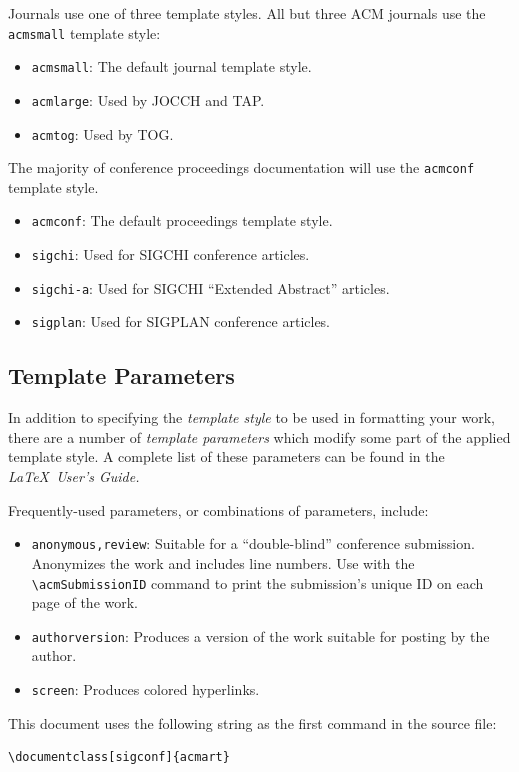 \documentclass[sigconf, nonacm]{acmart}
\begin{document}
Journals use one of three template styles. All but three ACM journals
use the {\verb|acmsmall|} template style:
\begin{itemize}
  \item {\verb|acmsmall|}: The default journal template style.
  \item {\verb|acmlarge|}: Used by JOCCH and TAP.
  \item {\verb|acmtog|}: Used by TOG.
\end{itemize}

The majority of conference proceedings documentation will use the {\verb|acmconf|} template style.
\begin{itemize}
  \item {\verb|acmconf|}: The default proceedings template style.
        \item{\verb|sigchi|}: Used for SIGCHI conference articles.
        \item{\verb|sigchi-a|}: Used for SIGCHI ``Extended Abstract'' articles.
        \item{\verb|sigplan|}: Used for SIGPLAN conference articles.
\end{itemize}

\subsection{Template Parameters}

In addition to specifying the {\itshape template style} to be used in
formatting your work, there are a number of {\itshape template parameters}
which modify some part of the applied template style. A complete list
of these parameters can be found in the {\itshape \LaTeX\ User's Guide.}

Frequently-used parameters, or combinations of parameters, include:
\begin{itemize}
  \item {\verb|anonymous,review|}: Suitable for a ``double-blind''
        conference submission. Anonymizes the work and includes line
        numbers. Use with the \verb|\acmSubmissionID| command to print the
        submission's unique ID on each page of the work.
        \item{\verb|authorversion|}: Produces a version of the work suitable
        for posting by the author.
        \item{\verb|screen|}: Produces colored hyperlinks.
\end{itemize}

This document uses the following string as the first command in the
source file:
\begin{verbatim}
\documentclass[sigconf]{acmart}
\end{verbatim}
\end{document}
